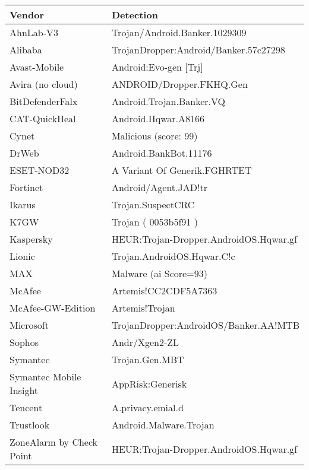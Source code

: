 \begin{tabular}{|l|l|}
    \hline
    \textbf{Vendor}          & \textbf{Detection}                     \\ \hline
    AhnLab-V3                & Trojan/Android.Banker.1029309          \\ \hline
    Alibaba                  & TrojanDropper:Android/Banker.57c27298  \\ \hline
    Avast-Mobile             & Android:Evo-gen {[}Trj{]}              \\ \hline
    Avira (no cloud)         & ANDROID/Dropper.FKHQ.Gen               \\ \hline
    BitDefenderFalx          & Android.Trojan.Banker.VQ               \\ \hline
    CAT-QuickHeal            & Android.Hqwar.A8166                    \\ \hline
    Cynet                    & Malicious (score: 99)                  \\ \hline
    DrWeb                    & Android.BankBot.11176                  \\ \hline
    ESET-NOD32               & A Variant Of Generik.FGHRTET           \\ \hline
    Fortinet                 & Android/Agent.JAD!tr                   \\ \hline
    Ikarus                   & Trojan.SuspectCRC                      \\ \hline
    K7GW                     & Trojan ( 0053b5f91 )                   \\ \hline
    Kaspersky                & HEUR:Trojan-Dropper.AndroidOS.Hqwar.gf \\ \hline
    Lionic                   & Trojan.AndroidOS.Hqwar.C!c             \\ \hline
    MAX                      & Malware (ai Score=93)                  \\ \hline
    McAfee                   & Artemis!CC2CDF5A7363                   \\ \hline
    McAfee-GW-Edition        & Artemis!Trojan                         \\ \hline
    Microsoft                & TrojanDropper:AndroidOS/Banker.AA!MTB  \\ \hline
    Sophos                   & Andr/Xgen2-ZL                          \\ \hline
    Symantec                 & Trojan.Gen.MBT                         \\ \hline
    Symantec Mobile Insight  & AppRisk:Generisk                       \\ \hline
    Tencent                  & A.privacy.emial.d                      \\ \hline
    Trustlook                & Android.Malware.Trojan                 \\ \hline
    ZoneAlarm by Check Point & HEUR:Trojan-Dropper.AndroidOS.Hqwar.gf \\ \hline
\end{tabular}
